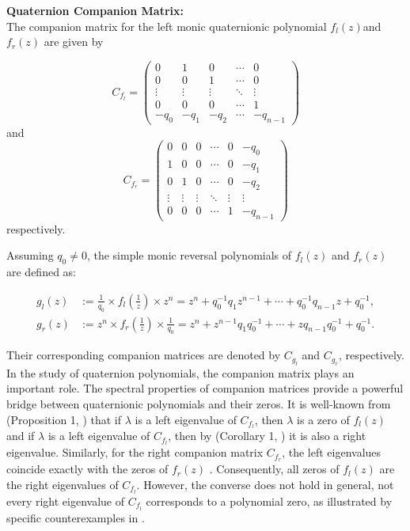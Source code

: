 \documentclass [12pt]{article}
\begin{document}
\noindent\textbf{Quaternion Companion Matrix:} \\ The  companion matrix for the left monic quaternionic polynomial \(f_{l}(z)\)and \(f_{r}(z)\) are given by

\[
C_{f_l} = 
\begin{pmatrix}
	0 & 1 & 0 & \cdots & 0 \\
	0 & 0 & 1 & \cdots & 0 \\
	\vdots & \vdots & \vdots & \ddots & \vdots \\
	0 & 0 & 0 & \cdots & 1 \\
	-q_0 & -q_1 & -q_2 & \cdots & -q_{n-1}
\end{pmatrix}
\]
and 
\[
C_{f_r} = 
\begin{pmatrix}
	0 & 0 &0& \cdots & 0 & -q_{0} \\
	1 & 0&0 & \cdots & 0 & -q_{1} \\
	0 & 1&0 & \cdots & 0 & -q_{2} \\
	\vdots &\vdots& \vdots & \ddots & \vdots & \vdots \\
	0 & 0 &0& \cdots & 1 & -q_{n-1}
\end{pmatrix}
\] respectively.

Assuming \(q_{0} \neq 0\), the simple monic reversal polynomials of \(f_{l}(z)\) and \(f_{r}(z)\) are defined as:

\[
\begin{aligned}
	g_{l}(z) &:= \frac{1}{q_{0}} \times f_{l}\left(\frac{1}{z}\right) \times z^{n} = z^{n} + q_{0}^{-1}q_{1}z^{n-1} + \cdots + q_{0}^{-1}q_{n-1}z + q_{0}^{-1}, \\
	g_{r}(z) &:= z^{n} \times f_{r}\left(\frac{1}{z}\right) \times \frac{1}{q_{0}} = z^{n} + z^{n-1}q_{1}q_{0}^{-1} + \cdots + zq_{n-1}q_{0}^{-1} + q_{0}^{-1}.
\end{aligned}
\]

Their corresponding companion matrices are denoted by \(C_{g_{l}}\) and \(C_{g_{r}}\), respectively. In the study of quaternion polynomials, the companion matrix plays an important role. \noindent The spectral properties of companion matrices provide a powerful bridge between quaternionic polynomials and their zeros. It is well-known from (Proposition 1, \cite{SR}) that if $\lambda$ is a left eigenvalue of $C_{f_{l}}$, then $\lambda$ is a zero of $f_{l}(z)$ and if $\lambda$ is a left eigenvalue of $C_{f_{l}}$, then by (Corollary 1, {\cite{SR}}) it is also a right eigenvalue. 
Similarly, for the right companion matrix $C_{f_r}$, the left eigenvalues coincide exactly with the zeros of $f_r(z)$ \cite{SR}. Consequently, all zeros of $f_l(z)$ are the right eigenvalues of $C_{f_l}$. However, the converse does not hold in general, not every right eigenvalue of $C_{f_l}$ corresponds to a polynomial zero, as illustrated by specific counterexamples in \cite{KI}.
\end{document}
